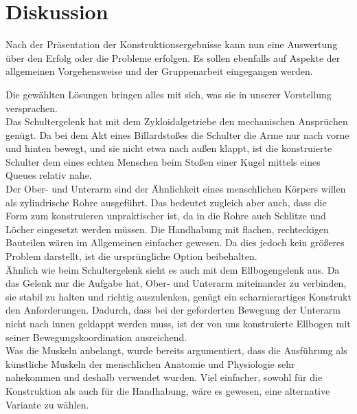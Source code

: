\chapter{Diskussion}
	Nach der Präsentation der Konstruktionsergebnisse kann nun eine Auswertung über den Erfolg oder die Probleme erfolgen.
	Es sollen ebenfalls auf Aspekte der allgemeinen Vorgehensweise und der Gruppenarbeit eingegangen werden.\par \medskip
	Die gewählten Lösungen bringen alles mit sich, was sie in unserer Vorstellung versprachen.\\
	Das Schultergelenk hat mit dem Zykloidalgetriebe den mechanischen Ansprüchen genügt.
	Da bei dem Akt eines Billardstoßes die Schulter die Arme nur nach vorne und hinten bewegt, und sie nicht etwa nach außen klappt, ist die konstruierte Schulter dem eines echten Menschen beim Stoßen einer Kugel mittels eines Queues relativ nahe.\\
	Der Ober- und Unterarm sind der Ähnlichkeit eines menschlichen Körpers willen als zylindrische Rohre ausgeführt.
	Das bedeutet zugleich aber auch, dass die Form zum konstruieren unpraktischer ist, da in die Rohre auch Schlitze und Löcher eingesetzt werden müssen.
	Die Handhabung mit flachen, rechteckigen Bauteilen wären im Allgemeinen einfacher gewesen.
	Da dies jedoch kein größeres Problem darstellt, ist die ursprüngliche Option beibehalten.\\
	Ähnlich wie beim Schultergelenk sieht es auch mit dem Ellbogengelenk aus.
	Da das Gelenk nur die Aufgabe hat, Ober- und Unterarm miteinander zu verbinden, sie stabil zu halten und richtig auszulenken, genügt ein scharnierartiges Konstrukt den Anforderungen.
	Dadurch, dass bei der geforderten Bewegung der Unterarm nicht nach innen geklappt werden muss, ist der von uns konstruierte Ellbogen mit seiner Bewegungskoordination ausreichend.\\
	Was die Muskeln anbelangt, wurde bereits argumentiert, dass die Ausführung als künstliche Muskeln der menschlichen Anatomie und Physiologie sehr nahekommen und deshalb verwendet wurden.
	Viel einfacher, sowohl für die Konstruktion als auch für die Handhabung, wäre es gewesen, eine alternative Variante zu wählen.
